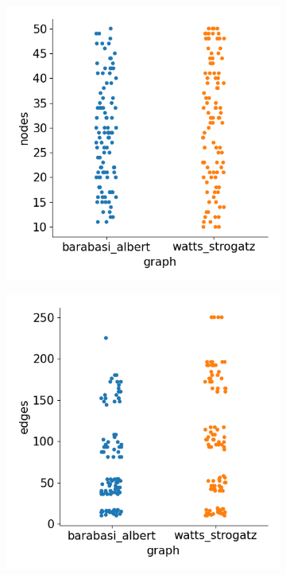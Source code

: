 \begin{figure}[H]
    \centering
    \begin{subfigure}{0.45\textwidth}
        \includegraphics[width=\linewidth]{images/results/random/gru/graph_nodes.png}
        \caption{} \label{fig:gru_graph_nodes}
    \end{subfigure}%
    \hfill
    \begin{subfigure}{0.45\textwidth}
        \includegraphics[width=\linewidth]{images/results/random/gru/graph_edges.png}
        \caption{} \label{fig:gru_graph_edges}
    \end{subfigure}%
  

\end{figure}
